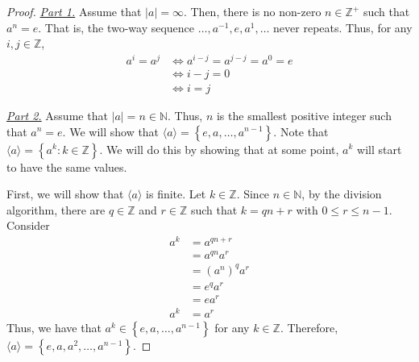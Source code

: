 \begin{proof}
    \phantom{wow}

    \underline{\textit{Part 1.}} Assume that \(|a| = \infty\). Then, there is no non-zero \(n \in \mathbb{Z}^+\) such that \(a^n = e\). That is, the two-way sequence \(\ldots, a^{-1}, e, a^1, \ldots\) never repeats. Thus, for any \(i, j \in \mathbb{Z}\),
    \[
    \begin{aligned}
        a^i = a^j &\iff a^{i-j} = a^{j-j} = a^{0} = e\\
                  &\iff i-j = 0 \\
                  &\iff i=j
    \end{aligned}
    \]

    \underline{\textit{Part 2.}} Assume that \(|a| = n \in \mathbb{N}\). Thus, \(n\) is the smallest positive integer such that \(a^n = e\). We will show that \(\langle a \rangle = \left\{e, a, \ldots, a^{n-1}\right\}\). Note that \(\langle a \rangle = \left\{a^k : k \in \mathbb{Z}\right\}\). We will do this by showing that at some point, \(a^k\) will start to have the same values.

    First, we will show that \(\langle a \rangle\) is finite. Let \(k \in \mathbb{Z}\). Since \(n \in \mathbb{N}\), by the division algorithm, there are \(q \in \mathbb{Z}\) and \(r \in \mathbb{Z}\) such that \(k = qn+r\) with \(0 \leq r \leq n-1\). Consider
    \[
    \begin{aligned}
        a^k &= a^{qn + r} \\
            &= a^{qn} a^r \\
            &= (a^n)^qa^r \\
            &= e^q a^r \\
            &= ea^r \\
        a^k &= a^r
    \end{aligned}
    \]
    Thus, we have that \(a^k \in \left\{e, a, \ldots, a^{n-1}\right\}\) for any \(k \in \mathbb{Z}\). Therefore, \(\langle a \rangle = \left\{e, a, a^2, \ldots, a^{n-1}\right\}\).


\end{proof}
